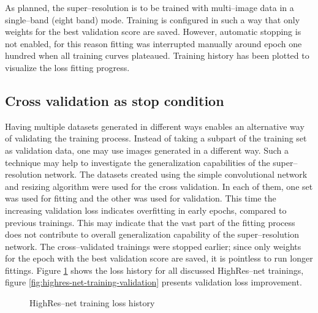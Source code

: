 As planned, the super--resolution is to be trained with multi--image data in a single--band (eight band) mode.
Training is configured in such a way that only weights for the best validation score are saved.
However, automatic stopping is not enabled, for this reason fitting was interrupted manually around epoch one hundred when all training curves plateaued.
Training history has been plotted to visualize the loss fitting progress.

\subsection{Cross validation as stop condition}
Having multiple datasets generated in different ways enables an alternative way of validating the training process.
Instead of taking a subpart of the training set as validation data, one may use images generated in a different way.
Such a technique may help to investigate the generalization capabilities of the super--resolution network.
The datasets created using the simple convolutional network and resizing algorithm were used for the cross validation.
In each of them, one set was used for fitting and the other was used for validation.
This time the increasing validation loss indicates overfitting in early epochs, compared to previous trainings.
This may indicate that the vast part of the fitting process does not contribute to overall generalization capability of the super--resolution network.
The cross--validated trainings were stopped earlier; since only weights for the epoch with the best validation score are saved, it is pointless to run longer fittings.
Figure \ref{fig:highres-net-training-loss} shows the loss history for all discussed HighRes--net trainings, figure \ref{fig:highres-net-training-validation} presents validation loss improvement.
\begin{figure}
    \centering
    \caption{HighRes--net training loss history}
    \label{fig:highres-net-training-loss}
\end{figure}
